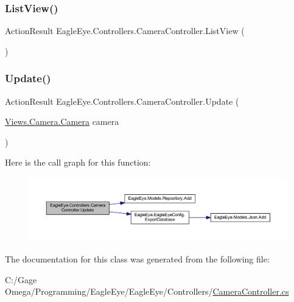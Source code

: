 \mbox{\label{class_eagle_eye_1_1_controllers_1_1_camera_controller_ae60e0235e0f741b4e102a7d1df22eed1}} 
\subsubsection{\texorpdfstring{ListView()}{ListView()}}
{\footnotesize\ttfamily Action\+Result Eagle\+Eye.\+Controllers.\+Camera\+Controller.\+List\+View (\begin{DoxyParamCaption}{ }\end{DoxyParamCaption})}





\mbox{\label{class_eagle_eye_1_1_controllers_1_1_camera_controller_a9e43f7e6f051aa5dbc695d68b4b013ab}} 
\subsubsection{\texorpdfstring{Update()}{Update()}}
{\footnotesize\ttfamily Action\+Result Eagle\+Eye.\+Controllers.\+Camera\+Controller.\+Update (\begin{DoxyParamCaption}\item[{\mbox{\hyperlink{class_eagle_eye_1_1_views_1_1_camera_1_1_camera}{Views.\+Camera.\+Camera}}}]{camera }\end{DoxyParamCaption})}





Here is the call graph for this function\+:\nopagebreak
\begin{figure}[H]
\begin{center}
\leavevmode
\includegraphics[width=350pt]{class_eagle_eye_1_1_controllers_1_1_camera_controller_a9e43f7e6f051aa5dbc695d68b4b013ab_cgraph}
\end{center}
\end{figure}


The documentation for this class was generated from the following file\+:\begin{DoxyCompactItemize}
\item 
C\+:/\+Gage Omega/\+Programming/\+Eagle\+Eye/\+Eagle\+Eye/\+Controllers/\mbox{\hyperlink{_camera_controller_8cs}{Camera\+Controller.\+cs}}\end{DoxyCompactItemize}
